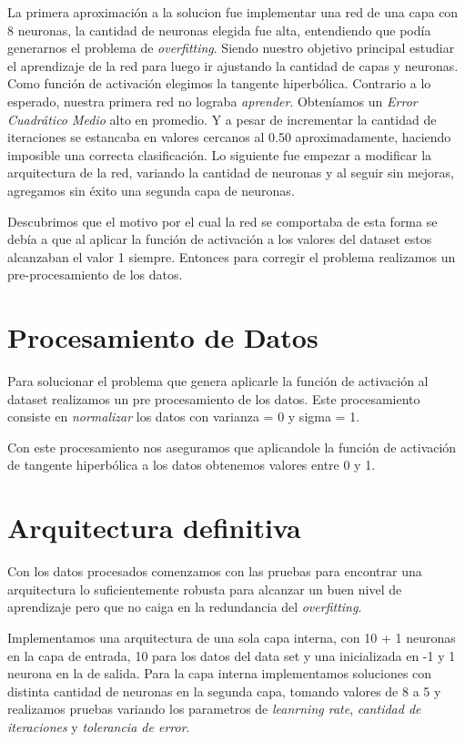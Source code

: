 \documentclass[onecolumn,10pt]{article}
\begin{document}
La primera aproximación a la solucion fue implementar una red de una
capa con 8 neuronas, la cantidad de neuronas elegida fue alta, 
entendiendo que podía generarnos el problema de \emph{overfitting}.
Siendo nuestro objetivo principal estudiar el aprendizaje de la red
para luego ir ajustando la cantidad de capas y neuronas.
Como función de activación elegimos la tangente hiperbólica. 
Contrario a lo esperado, nuestra primera red no lograba \emph{aprender}.
Obteníamos un \emph{Error Cuadrático Medio} alto en promedio. Y a pesar
de incrementar la cantidad de iteraciones se estancaba en valores
cercanos al 0.50 aproximadamente, haciendo imposible una correcta
clasificación.
Lo siguiente fue empezar a modificar la arquitectura de la red,
variando la cantidad de neuronas y al seguir sin mejoras, agregamos
sin éxito una segunda capa de neuronas.

Descubrimos que el motivo por el cual la red se comportaba de esta
forma se debía a que al aplicar la función de activación a los valores
del dataset estos alcanzaban el valor 1 siempre. Entonces para corregir
el problema realizamos un pre-procesamiento de los datos.


\section{Procesamiento de Datos}

Para solucionar el problema que genera aplicarle la función de activación
al dataset realizamos un pre procesamiento de los datos.
Este procesamiento consiste en \emph{normalizar} los datos con varianza = 0 y
sigma = 1.

Con este procesamiento nos aseguramos que aplicandole la función de
activación de tangente hiperbólica a los datos obtenemos valores entre
0 y 1.

\section{Arquitectura definitiva}

Con los datos procesados comenzamos con las pruebas para encontrar
una arquitectura lo suficientemente robusta para alcanzar un buen nivel
de aprendizaje pero que no caiga en la redundancia del \emph{overfitting}.

Implementamos una arquitectura de una sola capa interna, con 10 + 1 neuronas 
en la capa de entrada, 10 para los datos del data set y una inicializada en -1
y 1 neurona en la de salida. Para la capa interna implementamos
soluciones con distinta cantidad de neuronas en la segunda capa, tomando 
valores de 8 a 5 y realizamos pruebas variando los parametros de
 \emph{leanrning rate}, \emph{cantidad de iteraciones} y \emph{tolerancia de error}.
\end{document}

